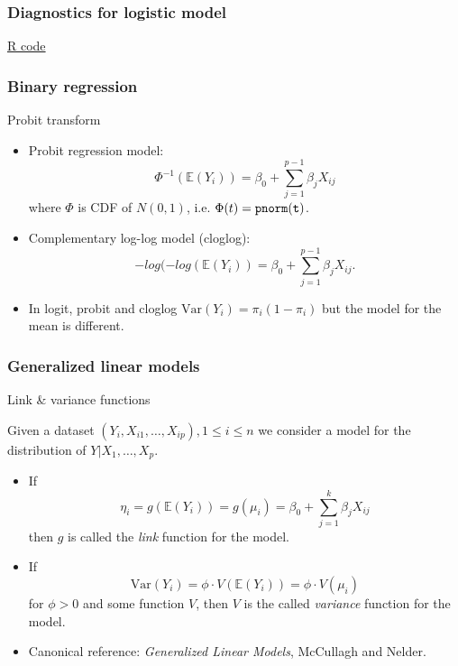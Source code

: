 \documentclass[handout]{beamer}
\newcommand{\V}{\text{Var}}
\newcommand{\Ee}{\mathbb{E}}
\begin{document}
   \begin{frame}
   \frametitle{Diagnostics for logistic model}
   \begin{center}
   \end{center}
   \href{http://stats191.stanford.edu/logistic.html#flu-example}{R code}
   \end{frame}


   \begin{frame} \frametitle{Binary regression}

   \begin{block}
   {Probit transform}

    \begin{itemize}

      \item Probit regression model:
   $$
   \Phi^{-1}(\Ee(Y_i))= \beta_0 + \sum_{j=1}^{p-1} \beta_j X_{ij}$$
   where $\Phi$ is CDF of $N(0,1)$, i.e. $\Phi(t) = {\tt pnorm(t)}$.
   \item Complementary log-log model (cloglog):
   $$
   -log(-log(\Ee(Y_i)) = \beta_0 + \sum_{j=1}^{p-1} \beta_j X_{ij}.
   $$
   \item In logit, probit and cloglog $\V(Y_i)=\pi_i(1-\pi_i)$ but the model
   for the mean is different.

   \end{itemize}
   \end{block}
   \end{frame}


   \begin{frame} \frametitle{Generalized linear models}

   \begin{block}
   {Link \& variance functions}

   Given a dataset $(Y_i, X_{i1}, \dots, X_{ip}), 1 \leq i \leq n$
      we consider a model for the distribution of $Y|X_1, \dots, X_p$.
       \begin{itemize}

   \item If
   $$\eta_i=g(\Ee(Y_i)) = g(\mu_i) = \beta_0 + \sum_{j=1}^k \beta_j X_{ij}$$
   then $g$ is called the {\em link} function for the model.

   \item If
   $$
   \V(Y_i) = \phi \cdot V(\Ee(Y_i)) = \phi \cdot V(\mu_i)$$
   for $\phi > 0$ and some function $V$, then $V$ is the called {\em variance} function for the model.

   \item Canonical reference: {\em Generalized Linear Models}, McCullagh and Nelder.
       \end{itemize}
    \end{block}
   \end{frame}
\end{document}
